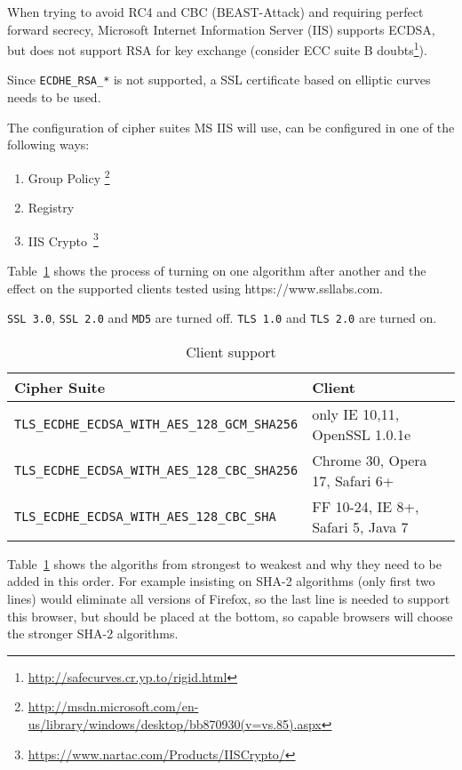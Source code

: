 When trying to avoid RC4 and CBC (BEAST-Attack) and requiring perfect
forward secrecy, Microsoft Internet Information Server (IIS) supports
ECDSA, but does not support RSA for key exchange (consider ECC suite
B doubts\footnote{\url{http://safecurves.cr.yp.to/rigid.html}}).

Since \verb|ECDHE_RSA_*| is not supported, a SSL certificate based on
elliptic curves needs to be used.

The configuration of cipher suites MS IIS will use, can be configured in one
of the following ways:
\begin{enumerate}
\item Group Policy \footnote{\url{http://msdn.microsoft.com/en-us/library/windows/desktop/bb870930(v=vs.85).aspx}}
\item Registry
\item IIS Crypto~\footnote{\url{https://www.nartac.com/Products/IISCrypto/}}
\end{enumerate}


Table~\ref{tab:MS_IIS_Client_Support} shows the process of turning on
one algorithm after another and the effect on the supported clients
tested using https://www.ssllabs.com.

\verb|SSL 3.0|, \verb|SSL 2.0| and \verb|MD5| are turned off.
\verb|TLS 1.0| and \verb|TLS 2.0| are turned on.

\begin{table}[h]
  \centering
  \small
  \begin{tabular}{ll}
    \toprule
    Cipher Suite & Client \\
    \midrule
    \verb|TLS_ECDHE_ECDSA_WITH_AES_128_GCM_SHA256| & only IE 10,11, OpenSSL 1.0.1e \\
    \verb|TLS_ECDHE_ECDSA_WITH_AES_128_CBC_SHA256| & Chrome 30, Opera 17, Safari 6+ \\
    \verb|TLS_ECDHE_ECDSA_WITH_AES_128_CBC_SHA| & FF 10-24, IE 8+, Safari 5, Java 7\\
    \bottomrule 
 \end{tabular}
  \caption{Client support}
  \label{tab:MS_IIS_Client_Support}
\end{table}

Table~\ref{tab:MS_IIS_Client_Support} shows the algoriths from
strongest to weakest and why they need to be added in this order. For
example insisting on SHA-2 algorithms (only first two lines) would
eliminate all versions of Firefox, so the last line is needed to
support this browser, but should be placed at the bottom, so capable
browsers will choose the stronger SHA-2 algorithms.

